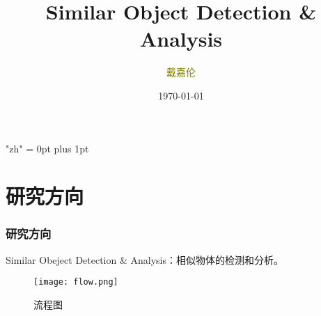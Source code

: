 \documentclass[notheorems,mathserif,table,compress]{beamer}  %
\begin{document}
\XeTeXlinebreaklocale "zh"         %
\XeTeXlinebreakskip = 0pt plus 1pt %
\begin{comment}
\AtBeginSection[]{                              %
  \frame<handout:0>{
    \frametitle{Content}\small
    \tableofcontents[current,currentsubsection]
  }
}
\AtBeginSubsection[]                            %
{
  \frame<handout:0>                             %
  {
    \frametitle{下一节内容}\small
    \tableofcontents[current,currentsubsection] %
  }
}
\end{comment}
\title[]{Similar Object Detection \& Analysis}
\author[戴嘉伦]{\textcolor{olive}{戴嘉伦}}
\institute[中国海洋大学]{\small\textcolor{violet}{中国海洋大学}}
\date{\today}
\frame{ \titlepage }

\section{研究方向}
\begin{frame}
  \frametitle{研究方向}
   Similar Obeject Detection \& Analysis：相似物体的检测和分析。\\
   \begin{figure}[!ht]
   \centering
   \texttt{[image: flow.png]}
   \caption{流程图}
   \end{figure}
\end{frame}
\end{document}
